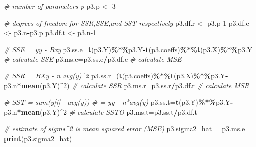 \documentclass[
]{article}
\newenvironment{Shaded}{\begin{snugshade}}{\end{snugshade}}
\newcommand{\CommentTok}[1]{\textcolor[rgb]{0.56,0.35,0.01}{\textit{#1}}}
\newcommand{\DecValTok}[1]{\textcolor[rgb]{0.00,0.00,0.81}{#1}}
\newcommand{\FunctionTok}[1]{\textcolor[rgb]{0.13,0.29,0.53}{\textbf{#1}}}
\newcommand{\NormalTok}[1]{#1}
\newcommand{\OtherTok}[1]{\textcolor[rgb]{0.56,0.35,0.01}{#1}}
\newcommand{\SpecialCharTok}[1]{\textcolor[rgb]{0.81,0.36,0.00}{\textbf{#1}}}
\begin{document}
\begin{Shaded}
\begin{Highlighting}[]
\CommentTok{\# number of parameters p}
\NormalTok{p3.p }\OtherTok{\textless{}{-}} \DecValTok{3}

\CommentTok{\# degrees of freedom for SSR,SSE,and SST respectively}
\NormalTok{p3.df.r }\OtherTok{\textless{}{-}}\NormalTok{ p3.p}\DecValTok{{-}1}
\NormalTok{p3.df.e }\OtherTok{\textless{}{-}}\NormalTok{ p3.n}\SpecialCharTok{{-}}\NormalTok{p3.p}
\NormalTok{p3.df.t }\OtherTok{\textless{}{-}}\NormalTok{ p3.n}\DecValTok{{-}1}

\CommentTok{\# SSE = y\textquotesingle{}y {-} B\textquotesingle{}x\textquotesingle{}y}
\NormalTok{p3.ss.e}\OtherTok{=}\FunctionTok{t}\NormalTok{(p3.Y)}\SpecialCharTok{\%*\%}\NormalTok{p3.Y}\SpecialCharTok{{-}}\FunctionTok{t}\NormalTok{(p3.coeffs)}\SpecialCharTok{\%*\%}\FunctionTok{t}\NormalTok{(p3.X)}\SpecialCharTok{\%*\%}\NormalTok{p3.Y       }\CommentTok{\# calculate SSE}
\NormalTok{p3.ms.e}\OtherTok{=}\NormalTok{p3.ss.e}\SpecialCharTok{/}\NormalTok{p3.df.e }\CommentTok{\# calculate MSE}

\CommentTok{\# SSR = B\textquotesingle{}X\textquotesingle{}y {-} n avg(y)\^{}2}
\NormalTok{p3.ss.r}\OtherTok{=}\NormalTok{(}\FunctionTok{t}\NormalTok{(p3.coeffs)}\SpecialCharTok{\%*\%}\FunctionTok{t}\NormalTok{(p3.X)}\SpecialCharTok{\%*\%}\NormalTok{p3.Y}\SpecialCharTok{{-}}\NormalTok{p3.n}\SpecialCharTok{*}\FunctionTok{mean}\NormalTok{(p3.Y)}\SpecialCharTok{\^{}}\DecValTok{2}\NormalTok{)     }\CommentTok{\# calculate SSR}
\NormalTok{p3.ms.r}\OtherTok{=}\NormalTok{p3.ss.r}\SpecialCharTok{/}\NormalTok{p3.df.r                                 }\CommentTok{\# calculate MSR}

\CommentTok{\# SST = sum(y[i] {-} avg(y))}
\CommentTok{\#     = y\textquotesingle{}y {-} n*avg(y)}
\NormalTok{p3.ss.t}\OtherTok{=}\FunctionTok{t}\NormalTok{(p3.Y)}\SpecialCharTok{\%*\%}\NormalTok{p3.Y}\SpecialCharTok{{-}}\NormalTok{p3.n}\SpecialCharTok{*}\FunctionTok{mean}\NormalTok{(p3.Y)}\SpecialCharTok{\^{}}\DecValTok{2}                    \CommentTok{\# calculate SSTO}
\NormalTok{p3.ms.t}\OtherTok{=}\NormalTok{p3.ss.t}\SpecialCharTok{/}\NormalTok{p3.df.t}

\CommentTok{\# estimate of sigma\^{}2 is mean squared error (MSE)}
\NormalTok{p3.sigma2\_hat }\OtherTok{=}\NormalTok{ p3.ms.e}
\FunctionTok{print}\NormalTok{(p3.sigma2\_hat)}
\end{Highlighting}
\end{Shaded}
\end{document}
